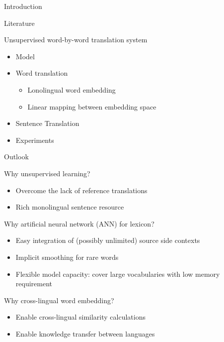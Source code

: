 \documentclass[11pt, a4paper, landscape]{article}
\begin{document}
	\TitlePage
	
	\NewPage
	
	
	\vfill
	\begin{description}
		\item Introduction
		\item Literature
		\item Unsupervised word-by-word translation system
			\begin{itemize}
				\item Model
				\item Word translation
					\begin{itemize}
						\item Lonolingual word embedding
						\item Linear mapping between embedding space
						 
					\end{itemize}
				\item Sentence Translation
				\item Experiments
			\end{itemize}
		\item Outlook
	\end{description}
	\vfill
	
	\NewPage
	
	\vfill
	\begin{description}
		\item Why unsupervised learning?
		\begin{itemize}
			\item Overcome the lack of reference translations
			\item Rich monolingual sentence resource \\
		\end{itemize}
		\item Why artificial neural network (ANN) for lexicon?
		\begin{itemize}
			\item Easy integration of
			(possibly unlimited) source side contexts
			\item Implicit smoothing for rare words
			\item Flexible model capacity: cover large vocabularies with low memory requirement\\
		\end{itemize}
		\item Why cross-lingual word embedding?
		\begin{itemize}
			
			\item Enable cross-lingual similarity calculations
			\item Enable knowledge transfer between languages
		\end{itemize}
		
	\end{description}
	\vfill
	
\end{document}
